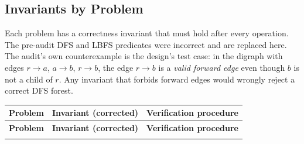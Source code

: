 \documentclass[12pt,a4paper]{article}
\begin{document}
\subsection{Invariants by Problem}
\label{sec:invariants}

Each problem has a correctness invariant that must hold after every operation. The pre-audit DFS and LBFS predicates were incorrect and are replaced here. The audit's own counterexample is the design's test case: in the digraph with edges $r \to a$, $a \to b$, $r \to b$, the edge $r \to b$ is a \emph{valid forward edge} even though $b$ is not a child of $r$. Any invariant that forbids forward edges would wrongly reject a correct DFS forest.

\begin{longtable}{|p{2.6cm}|p{8.2cm}|p{3.6cm}|}
\hline
\textbf{Problem} & \textbf{Invariant (corrected)} & \textbf{Verification procedure} \\
\hline
\endfirsthead
\hline
\textbf{Problem} & \textbf{Invariant (corrected)} & \textbf{Verification procedure} \\
\hline
\endhead
\hline
\endfoot


\end{longtable}
\end{document}
